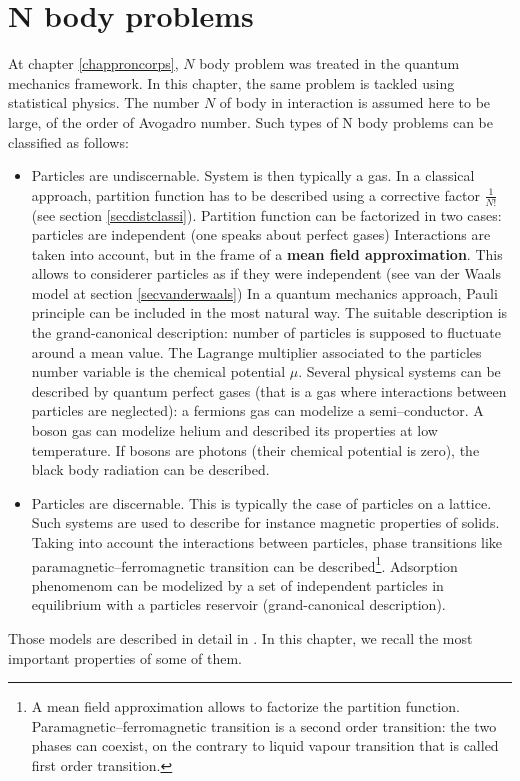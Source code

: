 \documentclass[12pt]{book}
\begin{document}
\section{N body problems}
At chapter \ref{chapproncorps}, $N$ body problem was treated in the quantum
mechanics framework. In this chapter, the same problem is tackled using
statistical physics. The number $N$ of body in interaction is assumed
here to be large, of the order of Avogadro number.
Such types of N body problems can be classified as follows:
 \begin{itemize}
\item Particles are undiscernable. System is then typically a gas. In a
  classical approach, partition function has to be described using a
  corrective factor
$\frac{1}{N!}$ (see section \ref{secdistclassi}). Partition function can be
factorized in two cases: particles are independent (one speaks about perfect
gases)
Interactions are taken into account, but in the frame of a {\bf mean field
  approximation}. This allows to considerer particles as if
they were independent (see van der Waals model at section
\ref{secvanderwaals})
In a quantum mechanics approach, Pauli principle can be included in the most
natural way. The suitable description is the grand-canonical description: 
number of particles is supposed to fluctuate around a mean value.
The Lagrange multiplier associated to the particles number variable is the
chemical potential $\mu$. Several physical systems can be described by quantum
perfect gases (that is a gas where interactions between particles are
neglected): a fermions gas can modelize a semi--conductor. A boson gas can
modelize helium and described its properties at low temperature. 
If bosons are photons (their chemical potential is zero), the black body
radiation can be described.
\item Particles are discernable. This is typically the case of particles on a
  lattice. Such systems are used to describe for instance magnetic properties
  of solids. Taking into account the interactions between particles, phase
  transitions like paramagnetic--ferromagnetic transition can be
  described\footnote{%
A mean field approximation allows to factorize the partition
function. Paramagnetic--ferromagnetic transition is a second order transition:
the two phases can coexist, on the contrary to liquid vapour transition that
is called first order transition.}. Adsorption phenomenom can be modelized by
a set of independent particles in equilibrium with a particles reservoir
(grand-canonical description).
\end{itemize}
Those models are described in detail in \cite{ph:physt:Diu89}.
In this chapter, we recall the most important properties of some of them.
\end{document}
